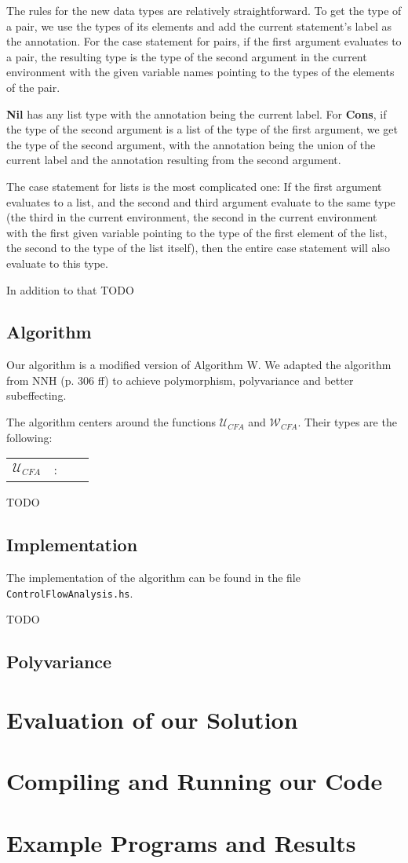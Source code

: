\documentclass[a4paper,11pt]{article}
\begin{document}
The rules for the new data types are relatively straightforward. To get the type of a pair, we use the types of its elements and add the current statement's label as the annotation. 
For the case statement for pairs, if the first argument evaluates to a pair, the resulting type is the type of the second argument in the current environment with the given variable names pointing to the types of the elements of the pair.

\textbf{Nil} has any list type with the annotation being the current label. For \textbf{Cons}, if the type of the second argument is a list of the type of the first argument, we get the type of the second argument, with the annotation being the union of the current label and the annotation resulting from the second argument. 

The case statement for lists is the most complicated one: If the first argument evaluates to a list, and the second and third argument evaluate to the same type (the third in the current environment, the second in the current environment with the first given variable pointing to the type of the first element of the list, the second to the type of the list itself), then the entire case statement will also evaluate to this type.

In addition to that TODO

\subsection{Algorithm}
Our algorithm is a modified version of Algorithm W. We adapted the algorithm from NNH (p. 306 ff) to achieve polymorphism, polyvariance and better subeffecting. 

The algorithm centers around the functions $\mathcal{U}_{CFA}$ and $\mathcal{W}_{CFA}$. Their types are the following:
\begin{tabular}{l l l l}
$\mathcal{U}_{CFA}$ & : & 

\end{tabular}

TODO

\subsection{Implementation}
The implementation of the algorithm can be found in the file \texttt{ControlFlowAnalysis.hs}. 

TODO

\subsection{Polyvariance}


\section{Evaluation of our Solution}


\section{Compiling and Running our Code}


\section{Example Programs and Results}
\end{document}
